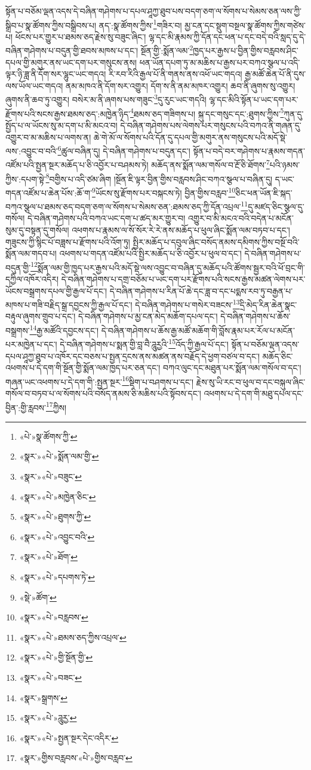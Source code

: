 སྟོན་པ་བཅོམ་ལྡན་འདས་དེ་བཞིན་གཤེགས་པ་དཔལ་ཤཱཀྱ་ཐུབ་པས་བདག་ཅག་ལ་སོགས་པ་སེམས་ཅན་ལས་ཀྱི་སྒྲིབ་པ་སྣ་ཚོགས་ཀྱིས་བསྒྲིབས་པ། ནད་:སྣ་ཚོགས་ཀྱིས་\footnote{«པེ་»སྣ་ཚོགས་ཀྱི་}གཟིར་བ། མྱ་ངན་དང་སྡུག་བསྔལ་སྣ་ཚོགས་ཀྱིས་གཙེས་པ། ཕོངས་པར་གྱུར་པ་ཐམས་ཅད་རྗེས་སུ་བཟུང་ཞིང་། ལྷ་དང་མི་རྣམས་ཀྱི་དོན་དང་ཕན་པ་དང་བདེ་བའི་སླད་དུ་དེ་བཞིན་གཤེགས་པ་བདུན་གྱི་ཐབས་མཁས་པ་དང་། སྔོན་གྱི་:སྨོན་ལམ་\footnote{«སྣར་»«པེ་»སྨོན་ལམ་གྱི་}ཁྱད་པར་རྒྱས་པ་བྱིན་གྱིས་བརླབས་ཤིང་དཔལ་གྱི་མགུར་ནས་ཡང་དག་པར་གསུངས་ནས། ཕན་ཡོན་དཔག་ཏུ་མ་མཆིས་པ་རྒྱས་པར་བཀའ་སྩལ་པ་འདི་ལྟར་ཉི་ཟླ་ནི་དོག་སར་ལྷུང་ཡང་གདའ། རི་རབ་རིའི་རྒྱལ་པོ་ནི་གནས་ནས་འཕོ་ཡང་གདའ། རྒྱ་མཚོ་ཆེན་པོ་ནི་དུས་ལས་ཡོལ་ཡང་གདའ། ནམ་མཁའ་ནི་དོག་སར་འགྱུར། དོག་ས་ནི་ནམ་མཁར་འགྱུར། ཆབ་ནི་ཞུགས་སུ་འགྱུར། ཞུགས་ནི་ཆབ་ཏུ་འགྱུར། བསེར་མ་ནི་ཞགས་པས་གཟུང་\footnote{«སྣར་»«པེ་»བཟུང་}དུ་རུང་ཡང་གདའི། ལྷ་དང་མིའི་སྟོན་པ་ཡང་དག་པར་རྫོགས་པའི་སངས་རྒྱས་ཐམས་ཅད་:མཁྱེན་ཉིད་\footnote{«སྣར་»«པེ་»མཁྱེན་ཅིང་}ཐམས་ཅད་གཟིགས་པ། སྐུ་དང་གསུང་དང་:ཐུགས་ཀྱིས་\footnote{«སྣར་»«པེ་»ཐུགས་ཀྱི་}ཀུན་དུ་སྤྱོད་པ་ལ་ཡོངས་སུ་མ་དག་པ་མི་མངའ་བ། དེ་བཞིན་གཤེགས་པས་ལེགས་པར་གསུངས་པའི་བཀའ་ནི་གཞན་དུ་འགྱུར་བ་མ་མཆིས་པ་ལགས་ན། ཆེ་གེ་མོ་ལ་སོགས་པའི་དོན་དུ་དཔལ་གྱི་མགུར་ནས་གསུངས་པའི་མདོ་སྡེ་ལས་:འབྱུང་བ་བའི་\footnote{«སྣར་»«པེ་»འབྱུང་བའི་}ཚུལ་བཞིན་དུ། དེ་བཞིན་གཤེགས་པ་བདུན་དང་། སྟོན་པ་བདེ་བར་གཤེགས་པ་རྣམས་གདན་འཛོམ་པའི་སྤྱན་སྔར་མཆོད་པ་ཅི་འབྱོར་པ་བཤམས་ཏེ། མཆོད་ནས་སྨོན་ལམ་གསོལ་བ་རྔོ་ཅི་ཐོགས་\footnote{«སྣར་»«པེ་»ཐོག་}པའི་ཉམས་ཀྱིས་:དཔག་སྟེ་\footnote{«སྣར་»«པེ་»དཔགས་ཏེ་}བགྱིས་པ་འདི་ཙམ་ཞིག །སྔོན་ཇི་ལྟར་བྱིན་གྱིས་བརླབས་ཤིང་བཀའ་སྩལ་པ་བཞིན་དུ། ད་ཡང་གདན་འཛོམ་པ་ཆེན་པོས་:ཆོ་ག་\footnote{«སྡེ་»ཚོག་}ཡོངས་སུ་རྫོགས་པར་བསྐངས་ཏེ། བྱིན་གྱིས་བརླབ་\footnote{«སྣར་»«པེ་»བརླབས་}ཅིང་ཕན་ཡོན་ཇི་སྐད་བཀའ་སྩལ་པ་ཐམས་ཅད་བདག་ཅག་ལ་སོགས་པ་སེམས་ཅན་:ཐམས་ཅད་ཀྱི་དོན་འཔྲལ་\footnote{«སྣར་»«པེ་»ཐམས་ཅད་ཀྱིས་འཔྲལ་}དུ་མཛད་ཅིང་སྩལ་དུ་གསོལ། དེ་བཞིན་གཤེགས་པའི་བཀའ་ཡང་དག་པ་ཚད་མར་གྱུར་བ། འགྱུར་བ་མི་མངའ་བའི་བདེན་པ་མངོན་སུམ་དུ་བསྟན་དུ་གསོལ། འཕགས་པ་རྣམས་ལ་སོ་སོར་རེ་རེ་ནས་མཆོད་པ་ཕུལ་ཞིང་སྨོན་ལམ་བཏབ་པ་དང་། གཟུངས་ཀྱི་སྙིང་པོ་བཟླས་པ་རྫོགས་པའི་འོག་ཏུ། སྤྱིར་མཆོད་པ་དབུལ་ཞིང་བསོད་ནམས་དམིགས་ཀྱིས་བསྔོ་བའི་སྨོན་ལམ་གདབ་པ། འཕགས་པ་གདན་འཛོམ་པའི་སྤྱིར་མཆོད་པ་ཅི་འབྱོར་པ་ཕུལ་བ་དང་། དེ་བཞིན་གཤེགས་པ་བདུན་གྱི་\footnote{«སྣར་»«པེ་»གྱི་སྔོན་གྱི་}སྨོན་ལམ་གྱི་ཁྱད་པར་རྒྱས་པའི་མདོ་སྡེ་ལས་འབྱུང་བ་བཞིན་དུ་མཆོད་པའི་ཚོགས་སྦྱར་བའི་ཕོ་བྲང་གི་དཀྱིལ་འཁོར་འདིར། དེ་བཞིན་གཤེགས་པ་དགྲ་བཅོམ་པ་ཡང་དག་པར་རྫོགས་པའི་སངས་རྒྱས་མཚན་ལེགས་པར་ཡོངས་བསྒྲགས་དཔལ་གྱི་རྒྱལ་པོ་དང་། དེ་བཞིན་གཤེགས་པ་རིན་པོ་ཆེ་དང་ཟླ་བ་དང་པདྨས་རབ་ཏུ་བརྒྱན་པ་མཁས་པ་གཟི་བརྗིད་སྒྲ་དབྱངས་ཀྱི་རྒྱལ་པོ་དང་། དེ་བཞིན་གཤེགས་པ་གསེར་བཟངས་\footnote{«སྣར་»«པེ་»བཟང་}དྲི་མེད་རིན་ཆེན་སྣང་བརྟུལ་ཞུགས་གྲུབ་པ་དང་། དེ་བཞིན་གཤེགས་པ་མྱ་ངན་མེད་མཆོག་དཔལ་དང་། དེ་བཞིན་གཤེགས་པ་ཆོས་བསྒྲགས་\footnote{«སྣར་»སྒྲགས་}རྒྱ་མཚོའི་དབྱངས་དང་། དེ་བཞིན་གཤེགས་པ་ཆོས་རྒྱ་མཚོ་མཆོག་གི་བློས་རྣམ་པར་རོལ་པ་མངོན་པར་མཁྱེན་པ་དང་། དེ་བཞིན་གཤེགས་པ་སྨན་གྱི་བླ་བཻ་ཌཱུརྱའི་\footnote{«སྣར་»«པེ་»ཌཱུརྱ་}འོད་ཀྱི་རྒྱལ་པོ་དང་། སྟོན་པ་བཅོམ་ལྡན་འདས་དཔལ་ཤཱཀྱ་ཐུབ་པ་འཁོར་དང་བཅས་པ་སྤྱན་དྲངས་ནས་མཚན་ནས་བརྗོད་དེ་ཕྱག་བཙལ་བ་དང་། མཆོད་ཅིང་འཕགས་པ་དེ་དག་གི་སྔོན་གྱི་སྨོན་ལམ་ཁྱད་པར་ཅན་དང་། བཀའ་ལུང་དང་མཐུན་པར་སྨོན་ལམ་གསོལ་བ་དང་། གཞན་ཡང་འཕགས་པ་དེ་དག་གི་:སྤྱན་སྔར་\footnote{«སྣར་»«པེ་»སྤྱན་སྔར་དེང་འདིར་}སྡིག་པ་བཤགས་པ་དང་། རྗེས་སུ་ཡི་རང་བ་ཕུལ་བ་དང་བསྐུལ་ཞིང་གསོལ་བ་བཏབ་པ་ལ་སོགས་པའི་བསོད་ནམས་ཅི་མཆིས་པའི་སྟོབས་དང་། འཕགས་པ་དེ་དག་གི་མཐུ་དཔལ་དང་བྱིན་:གྱི་རླབས་\footnote{«སྣར་»གྱིས་བརླབས་«པེ་»གྱིས་བརླབ་}ཀྱིས། 